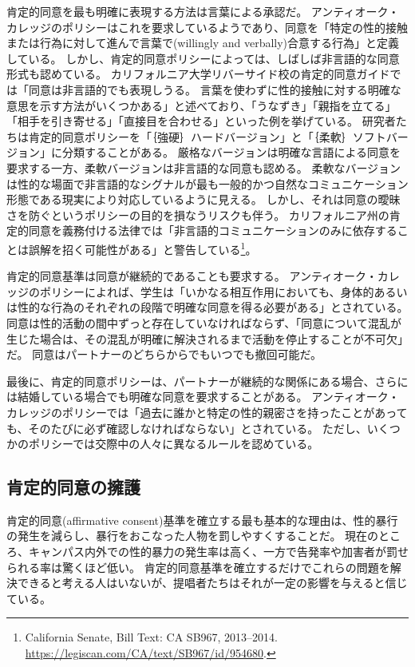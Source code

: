 \documentclass[paper=a4,book,openany]{jlreq}
\newcommand{\ig}[1]{}           %
\begin{document}
肯定的同意を最も明確に表現する方法は言葉による承認だ。
アンティオーク・カレッジのポリシーはこれを要求しているようであり、同意を「特定の性的接触または行為に対して進んで言葉で(willingly and verbally)合意する行為」と定義している\citep{college25:_sexual_offen_preven_polic}。
しかし、肯定的同意ポリシーによっては、しばしば非言語的な同意形式も認めている。
カリフォルニア大学リバーサイド校の肯定的同意ガイドでは「同意は非言語的でも表現しうる。
言葉を使わずに性的接触に対する明確な意思を示す方法がいくつかある」と述べており、「うなずき」「親指を立てる」「相手を引き寄せる」「直接目を合わせる」といった例を挙げている\citep{university25:_what_is_consen}。
研究者たちは肯定的同意ポリシーを「｛強硬｝{ハード}バージョン」と「｛柔軟｝{ソフト}バージョン」に分類することがある。
厳格なバージョンは明確な言語による同意を要求する一方、柔軟バージョンは非言語的な同意も認める。
柔軟なバージョンは性的な場面で非言語的なシグナルが最も一般的かつ自然なコミュニケーション形態である現実により対応しているように見える。
しかし、それは同意の曖昧さを防ぐというポリシーの目的を損なうリスクも伴う。
カリフォルニア州の肯定的同意を義務付ける法律では「非言語的コミュニケーションのみに依存することは誤解を招く可能性がある」と警告している\footnote{California Senate, Bill Text: CA SB967, 2013--2014. \url{https://legiscan.com/CA/text/SB967/id/954680}.}。

肯定的同意基準は同意が継続的であることも要求する。
アンティオーク・カレッジのポリシーによれば、学生は「いかなる相互作用においても、身体的あるいは性的な行為のそれぞれの段階で明確な同意を得る必要がある」とされている\ig{\footnote{Antioch College.}}。
同意は性的活動の間中ずっと存在していなければならず、「同意について混乱が生じた場合は、その混乱が明確に解決されるまで活動を停止することが不可欠」だ。
同意はパートナーのどちらからでもいつでも撤回可能だ\ig{\footnote{Antioch College.}}。

最後に、肯定的同意ポリシーは、パートナーが継続的な関係にある場合、さらには結婚している場合でも明確な同意を要求することがある。
アンティオーク・カレッジのポリシーでは「過去に誰かと特定の性的親密さを持ったことがあっても、そのたびに必ず確認しなければならない」とされている。
ただし、いくつかのポリシーでは交際中の人々に異なるルールを認めている。

\subsection{肯定的同意の擁護}

肯定的同意(affirmative consent)基準を確立する最も基本的な理由は、性的暴行の発生を減らし、暴行をおこなった人物を罰しやすくすることだ。
現在のところ、キャンパス内外での性的暴力の発生率は高く、一方で告発率や加害者が罰せられる率は驚くほど低い。
肯定的同意基準を確立するだけでこれらの問題を解決できると考える人はいないが、提唱者たちはそれが一定の影響を与えると信じている。
\end{document}
